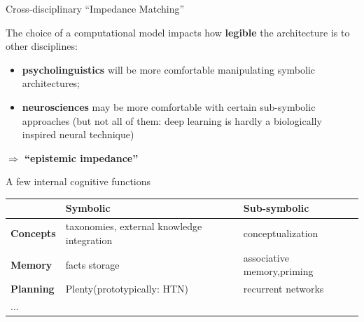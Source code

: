 \documentclass[compress]{beamer}
\begin{document}
\begin{frame}{Cross-disciplinary ``Impedance Matching''}

    The choice of a computational model impacts how {\bf legible} the architecture is
    to other disciplines:

    \begin{itemize}
        \item {\bf psycholinguistics} will be more comfortable manipulating
            symbolic architectures;
        \item {\bf neurosciences} may be more comfortable with certain
            sub-symbolic approaches (but not all of them: deep learning 
            is hardly a biologically inspired neural technique)
    \end{itemize}
    
    {\bf $\Rightarrow$ ``epistemic impedance''}




\end{frame}

\begin{frame}{A few internal cognitive functions}

    \begin{table}[]
        \begin{tabularx}{\linewidth}{lp{4.5cm}p{4.5cm}}
            \toprule
                     & {\bf Symbolic}  & {\bf Sub-symbolic}\\
            \midrule
            {\bf Concepts} & taxonomies, \newline external knowledge integration & conceptualization \\
            {\bf Memory}   & facts storage & associative memory,\newline priming \\
            {\bf Planning}   & Plenty\newline (prototypically: HTN) & recurrent
            networks~\cite{rueckert2016recurrent} \\
            ... & & \\
            \bottomrule
        \end{tabularx}
        \label{tab:options}
    \end{table}
\end{frame}
\end{document}
